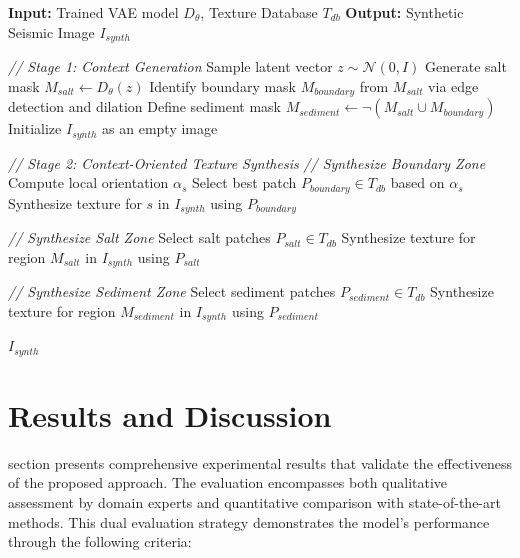 \documentclass{ieeeaccess}
\begin{document}
\begin{algorithm}[htbp]
\caption{Context-Oriented Seismic Image Synthesis}
\label{alg:synthesis}
\begin{algorithmic}[1]
\State \textbf{Input:} Trained VAE model $D_\theta$, Texture Database $T_{db}$
\State \textbf{Output:} Synthetic Seismic Image $I_{synth}$

\vspace{0.2cm}
\Statex \textit{// Stage 1: Context Generation}
\State Sample latent vector $z \sim \mathcal{N}(0, I)$
\State Generate salt mask $M_{salt} \leftarrow D_\theta(z)$
\State Identify boundary mask $M_{boundary}$ from $M_{salt}$ via edge detection and dilation
\State Define sediment mask $M_{sediment} \leftarrow \neg(M_{salt} \cup M_{boundary})$
\State Initialize $I_{synth}$ as an empty image

\vspace{0.2cm}
\Statex \textit{// Stage 2: Context-Oriented Texture Synthesis}
\State \textit{// Synthesize Boundary Zone}
    \State Compute local orientation $\alpha_s$
    \State Select best patch $P_{boundary} \in T_{db}$ based on $\alpha_s$
    \State Synthesize texture for $s$ in $I_{synth}$ using $P_{boundary}$
\EndFor

\State \textit{// Synthesize Salt Zone}
\State Select salt patches $P_{salt} \in T_{db}$
\State Synthesize texture for region $M_{salt}$ in $I_{synth}$ using $P_{salt}$

\State \textit{// Synthesize Sediment Zone}
\State Select sediment patches $P_{sediment} \in T_{db}$
\State Synthesize texture for region $M_{sediment}$ in $I_{synth}$ using $P_{sediment}$

\vspace{0.2cm}
\State \Return $I_{synth}$
\end{algorithmic}
\end{algorithm}


\section{Results and Discussion}
\label{sec:results}

 section presents comprehensive experimental results that validate the effectiveness of the proposed approach. The evaluation encompasses both qualitative assessment by domain experts and quantitative comparison with state-of-the-art methods. This dual evaluation strategy demonstrates the model's performance through the following criteria:
\end{document}
